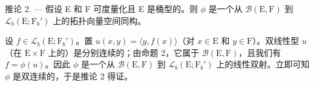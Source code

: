 推论 2. --- 假设 E 和 F 可度量化且 E 是桶型的。则 \(\phi\) 是一个从 \(\mathcal{B}(\mathrm{E},\mathrm{F})\) 到 \(\mathcal{L}_b(\mathrm{E};\mathrm{F}_b')\) 上的拓扑向量空间同构。

设 \(f \in \mathcal{L}_b(\mathrm{E}; \mathrm{F}_b')\)。置 \(u(x, y) = \langle y, f(x) \rangle\)（对 \(x \in \mathrm{E}\) 和 \(y \in \mathrm{F}\)）。双线性型 \(u\)（在 \(\mathrm{E} \times \mathrm{F}\) 上的）是分别连续的；由命题 2，它属于 \(\mathcal{B}(\mathrm{E}, \mathrm{F})\)，且我们有 \(f = \phi(u)\)。因此 \(\phi\) 是一个从 \(\mathcal{B}(\mathrm{E}, \mathrm{F})\) 到 \(\mathcal{L}_b(\mathrm{E}; \mathrm{F}_b')\) 上的线性双射。立即可知 \(\phi\) 是双连续的，于是推论 2 得证。

